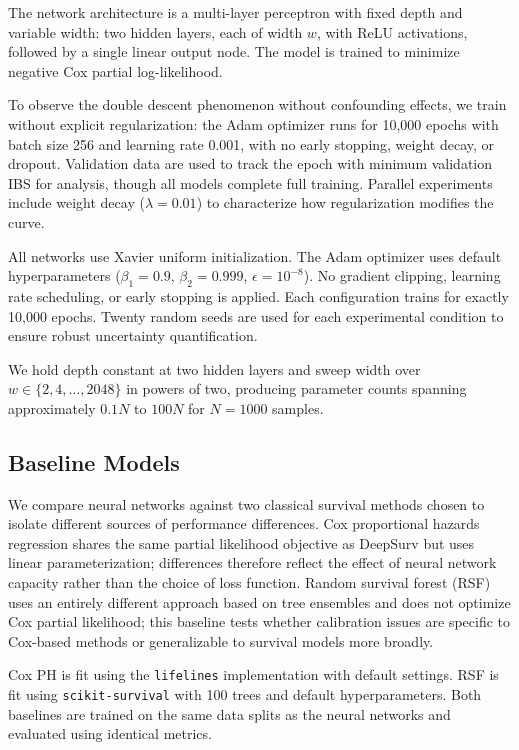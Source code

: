 \documentclass[12pt,a4paper]{article}
\begin{document}
The network architecture is a multi-layer perceptron with fixed depth and variable width: two hidden layers, each of width $w$, with ReLU activations, followed by a single linear output node. The model is trained to minimize negative Cox partial log-likelihood.

To observe the double descent phenomenon without confounding effects, we train without explicit regularization: the Adam optimizer runs for 10,000 epochs with batch size 256 and learning rate 0.001, with no early stopping, weight decay, or dropout. Validation data are used to track the epoch with minimum validation IBS for analysis, though all models complete full training. Parallel experiments include weight decay ($\lambda = 0.01$) to characterize how regularization modifies the curve.

All networks use Xavier uniform initialization. The Adam optimizer uses default hyperparameters ($\beta_1 = 0.9$, $\beta_2 = 0.999$, $\epsilon = 10^{-8}$). No gradient clipping, learning rate scheduling, or early stopping is applied. Each configuration trains for exactly 10,000 epochs. Twenty random seeds are used for each experimental condition to ensure robust uncertainty quantification.

We hold depth constant at two hidden layers and sweep width over $w \in \{2, 4, \ldots, 2048\}$ in powers of two, producing parameter counts spanning approximately $0.1N$ to $100N$ for $N = 1000$ samples. 

\subsection{Baseline Models}

We compare neural networks against two classical survival methods chosen to isolate different sources of performance differences. Cox proportional hazards regression \citep{cox1972regression} shares the same partial likelihood objective as DeepSurv but uses linear parameterization; differences therefore reflect the effect of neural network capacity rather than the choice of loss function. Random survival forest (RSF) \citep{ishwaran2008random} uses an entirely different approach based on tree ensembles and does not optimize Cox partial likelihood; this baseline tests whether calibration issues are specific to Cox-based methods or generalizable to survival models more broadly.

Cox PH is fit using the \texttt{lifelines} implementation with default settings. RSF is fit using \texttt{scikit-survival} with 100 trees and default hyperparameters. Both baselines are trained on the same data splits as the neural networks and evaluated using identical metrics.
\end{document}
